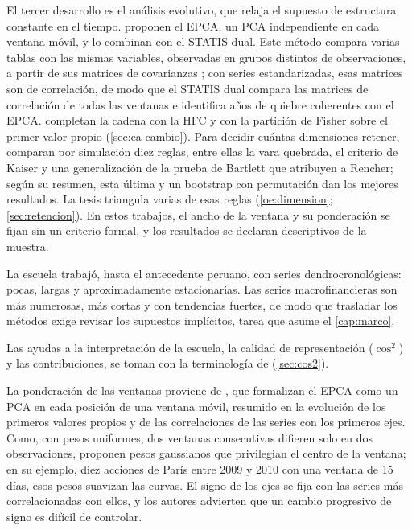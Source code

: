 El tercer desarrollo es el análisis evolutivo, que relaja el supuesto de estructura constante en
el tiempo. \textcite{camiz_maulucci_roig_2010} proponen el EPCA, un PCA independiente en cada ventana móvil, y lo combinan con el STATIS
dual. Este método compara varias tablas con las mismas variables, observadas en grupos distintos de
observaciones, a partir de sus matrices de covarianzas \parencite{lavit_et_al_1994};
con series estandarizadas, esas matrices son de correlación, de modo que el STATIS dual compara
las matrices de correlación de todas las ventanas e identifica años de quiebre coherentes con el
EPCA. \textcite{camiz_roig_2011} completan la cadena con la HFC y con la
partición de Fisher sobre el primer valor propio (\cref{sec:ea-cambio}). Para decidir cuántas
dimensiones retener, \textcite{camiz_pillar_2018} comparan por simulación diez reglas, entre ellas
la vara quebrada, el criterio de Kaiser y una generalización de la prueba de Bartlett que
atribuyen a Rencher; según su resumen, esta última y un bootstrap con permutación dan los mejores
resultados. La tesis triangula varias de esas reglas (\cref{oe:dimension}; \cref{sec:retencion}).
En estos trabajos, el ancho de la ventana y su ponderación se fijan sin un criterio formal, y los
resultados se declaran descriptivos de la muestra.

La escuela trabajó, hasta el antecedente peruano, con series dendrocronológicas: pocas, largas y
aproximadamente estacionarias. Las series macrofinancieras son más numerosas, más cortas y con
tendencias fuertes, de modo que trasladar los métodos exige revisar los supuestos implícitos,
tarea que asume el \cref{cap:marco}.

Las ayudas a la interpretación de la escuela, la calidad de representación ($\cos^2$) y las
contribuciones, se toman con la terminología de \textcite{escofier_pages_2023}
(\cref{sec:cos2}).

La ponderación de las ventanas proviene de \textcite{camiz_diblasi_2013}, que formalizan el EPCA como un PCA en cada posición de
una ventana móvil, resumido en la evolución de los primeros valores propios y de las correlaciones
de las series con los primeros ejes. Como, con pesos uniformes, dos ventanas consecutivas difieren
solo en dos observaciones, proponen pesos gaussianos que privilegian el centro de la ventana; en su
ejemplo, diez acciones de París entre 2009 y 2010 con una ventana de 15 días, esos pesos suavizan
las curvas. El signo de los ejes se fija con las series más correlacionadas con ellos, y los
autores advierten que un cambio progresivo de signo es difícil de controlar.

